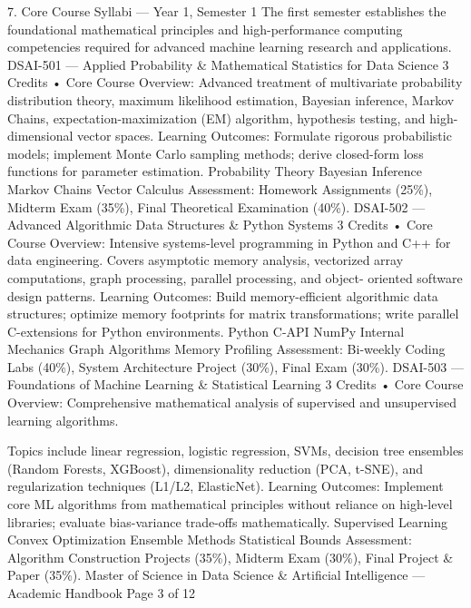\documentclass[12pt]{article}
\begin{document}
7. Core Course Syllabi — Year 1, Semester 1
The first semester establishes the foundational mathematical principles and high-performance computing
competencies required for advanced machine learning research and applications.
DSAI-501 — Applied Probability \& Mathematical Statistics for Data Science
3 Credits • Core
Course Overview: Advanced treatment of multivariate probability distribution theory, maximum likelihood
estimation, Bayesian inference, Markov Chains, expectation-maximization (EM) algorithm, hypothesis testing,
and high-dimensional vector spaces.
Learning Outcomes: Formulate rigorous probabilistic models; implement Monte Carlo sampling methods; derive
closed-form loss functions for parameter estimation.
Probability Theory Bayesian Inference Markov Chains Vector Calculus
Assessment: Homework Assignments (25\%), Midterm Exam (35\%), Final Theoretical Examination (40\%).
DSAI-502 — Advanced Algorithmic Data Structures \& Python Systems
3 Credits • Core
Course Overview: Intensive systems-level programming in Python and C++ for data engineering. Covers
asymptotic memory analysis, vectorized array computations, graph processing, parallel processing, and object-
oriented software design patterns.
Learning Outcomes: Build memory-efficient algorithmic data structures; optimize memory footprints for matrix
transformations; write parallel C-extensions for Python environments.
Python C-API NumPy Internal Mechanics Graph Algorithms Memory Profiling
Assessment: Bi-weekly Coding Labs (40\%), System Architecture Project (30\%), Final Exam (30\%).
DSAI-503 — Foundations of Machine Learning \& Statistical Learning
3 Credits • Core
Course Overview: Comprehensive mathematical analysis of supervised and unsupervised learning algorithms.

Topics include linear regression, logistic regression, SVMs, decision tree ensembles (Random Forests, XGBoost),
dimensionality reduction (PCA, t-SNE), and regularization techniques (L1/L2, ElasticNet).
Learning Outcomes: Implement core ML algorithms from mathematical principles without reliance on high-level
libraries; evaluate bias-variance trade-offs mathematically.
Supervised Learning Convex Optimization Ensemble Methods Statistical Bounds
Assessment: Algorithm Construction Projects (35\%), Midterm Exam (30\%), Final Project \& Paper (35\%).
Master of Science in Data Science \& Artificial Intelligence — Academic Handbook
Page 3 of 12
\end{document}
